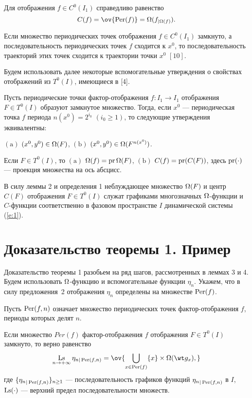 \begin{prop}
Для отображения $f\in C^0(I_1)$ справедливо равенство
$$
C(f)=\ov {\Per(f)}=\Omega(f_{|\Omega(f)}).
$$
\end{prop}


\begin{prop}
Если множество периодических точек отображения
$f\in C^0(I_1)$ замкнуто, а последовательность периодических точек $f$
сходится к $x^0$, то последовательность траекторий этих точек
сходится к траектории точки $x^0$  $[10]$.
\end{prop}

Будем использовать далее некоторые вспомогательные утверждения о
свойствах отображений из $T^0(I)$, имеющиеся в [4].


\begin{lem}
Пусть периодические точки фактор-отображения $f:I_1\to I_1$
отображения $F\in T^0(I)$ образуют замкнутое множество.
Тогда, если $x^0$ --- периодическая точка $f$ периода
$n(x^0)= 2^{i_0}$ $(i_0\geq 1)$, то следующие утверждения
эквивалентны\/{:}

$(\mathrm a)$ $(x^0, y^0)\in\Omega(F)$,\quad
$(\mathrm b)$ $(x^0, y^0)\in\Omega(F^{n(x^0)})$.
\end{lem}


\begin{lem}
Если $F\in T^0(I)$, то
$(\mathrm a)$  $\Omega(f)=\operatorname{pr}\Omega(F)$,
$(\mathrm b)$  $C(f)=\operatorname{pr}(C(F))$, здесь $\operatorname{pr}(\cdot)$ ---
проекция множества на ось абсцисс.
\end{lem}

В силу леммы 2 и определения 1 неблуждающее множество
$\Omega(F)$ и центр $C(F)$ отображения $F\in T^0(I)$
служат графиками многозначных $\Omega$-функции и $C$-функции
соответственно
в фазовом пространстве $I$ динамической системы (\ref{e:1}).


\section{Доказательство теоремы 1. Пример}


Доказательство теоремы 1 разобьем на ряд шагов, рассмотренных
в леммах 3 и 4. Будем использовать $\Omega$-функцию и
вспомогательные функции $\eta_n$.
Укажем, что в силу предложения~2 отображения
$\eta_n$ определены на множестве $\operatorname{Per}(f)$.

Пусть $\operatorname{Per}(f, n)$ означает множество
периодических точек
фактор-отображения $f$, периоды которых делят $n$.


\begin{lem}
Если множество $Per(f)$
фактор-отображения $f$ отображения
$F\in T^0(I)$ замкнуто,
то верно равенство
\begin{equation}\label{e:Ls}
\Ls\limits_{n\to +\infty}\eta_{n|\Per(f, n)}=
\ov{\bigcup\limits_{x\in \Per(f)}\{x\}\times\Om(\wt g_x),}
\end{equation}
где
$\{{\eta_n}_{|\operatorname{Per}(f, n)}\}_{n\geq 1}$ ---
последовательность графиков функций
${\eta_n}_{|\operatorname{Per}(f, n)}$ в $I$, $\Ls(\cdot)$ ---
верхний предел последовательности множеств.
\end{lem}



